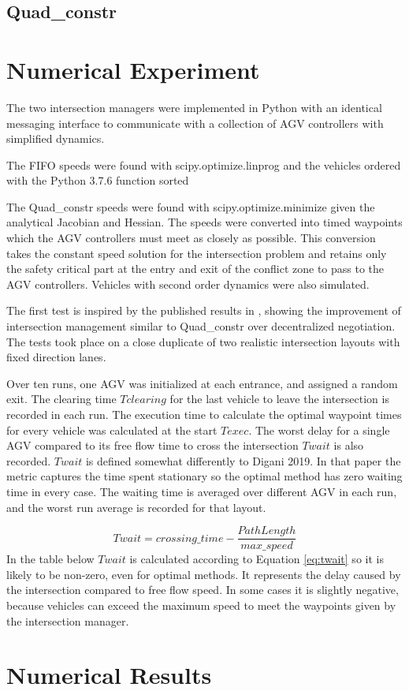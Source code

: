 \documentclass[11pt]{article} %
\begin{document}
\subsection{Quad\_constr}


\section{Numerical Experiment}
The two intersection managers were implemented in Python with an identical messaging interface to communicate with a collection of AGV controllers with simplified dynamics. 

The FIFO speeds were found with scipy.optimize.linprog and the vehicles ordered with the Python 3.7.6 function sorted

The Quad\_constr speeds were found with scipy.optimize.minimize given the analytical Jacobian and Hessian.
The speeds were converted into timed waypoints which the AGV controllers must meet as closely as possible. This conversion takes the constant speed solution for the intersection problem and retains only the safety critical part at the entry and exit of the conflict zone to pass to the AGV controllers. Vehicles with second order dynamics were also simulated.

The first test is inspired by the published results in \cite{Digani2019}, showing the improvement of intersection management similar to Quad\_constr over decentralized negotiation. The tests took place on a close duplicate of two realistic intersection layouts with fixed direction lanes.

Over ten runs, one AGV was initialized at each entrance, and assigned a random exit.   The clearing time $Tclearing$ for the last vehicle to leave the intersection is recorded in each run. The execution time to calculate the optimal waypoint times for every vehicle was calculated at the start $Texec$. The worst delay for a single AGV compared to its free flow time to cross the intersection $Twait$ is also recorded.
$Twait$ is defined somewhat differently to Digani 2019. In that paper the metric captures the time spent stationary so the optimal method has zero waiting time in every case. The waiting time is averaged over different AGV in each run, and the worst run average is recorded for that layout.

\begin{equation}
\label{eq:twait}
Twait = crossing\_time - \frac{PathLength}{max\_speed} 
\end{equation}
In the table below $Twait$ is calculated according to Equation \ref{eq:twait} so it is likely to be non-zero, even for optimal methods. It represents the delay caused by the intersection compared to free flow speed. In some cases it is slightly negative, because vehicles can exceed the maximum speed to meet the waypoints given by the intersection manager.   
\section{Numerical Results}
\label{sec:num_res}


\end{document}
